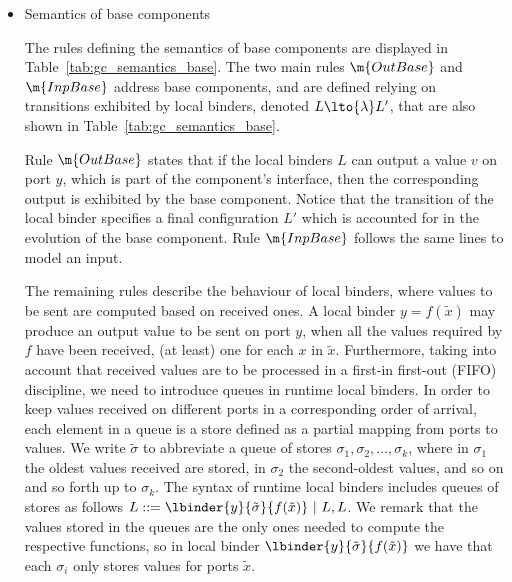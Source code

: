 \begin{itemize}
    \item Semantics of base components


The rules defining the semantics of base components are displayed in Table~\ref{tab:gc_semantics_base}. 
%
The two main rules $\m{OutBase}$ and $\m{InpBase}$ address base components, and are defined relying on transitions exhibited by local binders, denoted $L \lto{\lambda} L'$, that are also shown in Table~\ref{tab:gc_semantics_base}. 

Rule $\m{OutBase}$ states that if the
local binders $L$  can output a value $v$ on port $y$, which is part of the component's interface,
then the corresponding output is exhibited by the base component.
%
Notice that the transition of the local binder specifies a final configuration $L'$ which is accounted for in the evolution of the base component.
%
Rule $\m{InpBase}$ follows the same lines to model an input.


The remaining rules describe the behaviour of local binders, where values to be sent are computed based on received ones. A local binder $y=f(\tilde{x})$ may produce an output value to be sent on port $y$, when all the values required by $f$ have been received, (at least) one for each $x$ in $\tilde{x}$. 
%
Furthermore, taking into account that received values are to be processed in a first-in first-out (FIFO) discipline, we need to introduce queues in runtime local binders.
In order to keep values received on different ports in a corresponding order of arrival, each element in a queue is a store defined as a partial mapping from ports to values.
%
We write $\tilde \sigma$ to abbreviate a queue of stores $\sigma_1, \sigma_2, \ldots, \sigma_k$,
where in $\sigma_1$ the oldest values received are stored, in $\sigma_2$ the second-oldest values, and so on and so forth up to $\sigma_k$. 
%
The syntax of runtime local binders includes queues of stores as follows $L::=\lbinder{y}{\tilde{\sigma}}{f(\tilde{x})}\ |\ L,L$.
%
We remark that the values stored in the queues are the only ones needed to compute the respective functions, so in local binder $\lbinder{y}{\tilde{\sigma}}{f(\tilde{x})}$ we have that each $\sigma_i$ only stores values for ports $\tilde{x}$.










\begin{table}[t]
\centering
\begin{tabular} {c c c}


\end{tabular}
\end{table}
\end{itemize}

